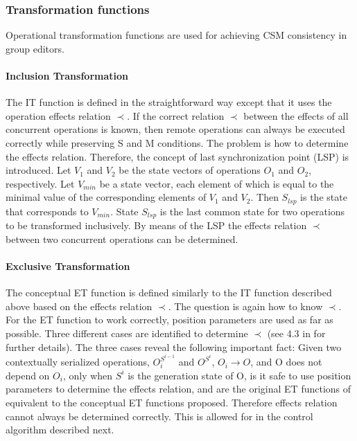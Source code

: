 \subsubsection{Transformation functions}
Operational transformation functions are used for achieving CSM consistency in group editors.

\paragraph{Inclusion Transformation}
The IT function is defined in the straightforward way except that it uses the operation effects relation $\prec$. If the correct relation $\prec$ between the effects of all concurrent operations is known, then remote operations can always be executed correctly while preserving S and M conditions. The problem is how to determine the effects relation. Therefore, the concept of last synchronization point (LSP) is introduced. Let $V_{1}$ and $V_{2}$ be the state vectors of operations $O_{1}$ and $O_{2}$, respectively. Let $V_{min}$ be a state vector, each element of which is equal to the minimal value of the corresponding elements of $V_{1}$ and $V_{2}$. Then $S_{lsp}$ is the state that corresponds to $V_{min}$. State $S_{lsp}$ is the last common state for two operations to be transformed inclusively. By means of the LSP the effects relation $\prec$ between two concurrent operations can be determined.

\paragraph{Exclusive Transformation}
The conceptual ET function is defined similarly to the IT function described above based on the effects relation $\prec$. The question is again how to know $\prec$. For the ET function to work correctly, position parameters are used as far as possible. Three different cases are identified to determine $\prec$ (see 4.3 in \cite{li04} for further details). The three cases reveal the following important fact: Given two contextually serialized operations, $O_i^{S^{i-1}}$ and $O^{S^i}$, $O_i \rightarrow O$, and O does not depend on $O_i$, only when $S^i$ is the generation state of O, is it safe to use position parameters to determine the effects relation, and are the original ET functions of \cite{sun98a} equivalent to the conceptual ET functions proposed. Therefore effects relation cannot always be determined correctly. This is allowed for in the control algorithm described next.

